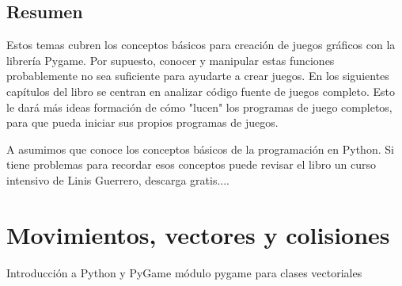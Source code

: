 {%






















\section{Resumen}

Estos temas  cubren los conceptos básicos para creación de juegos gráficos con la librería  Pygame. 
Por supuesto,  conocer y manipular estas funciones probablemente no sea suficiente para ayudarte a crear juegos. En los siguientes
capítulos del libro se centran en analizar código fuente de juegos completo. Esto le dará más  ideas formación  de cómo "{}lucen"{} los 
programas de juego completos, para que pueda iniciar  sus propios programas de juegos.

A asumimos que conoce los conceptos básicos de la programación en Python. Si tiene problemas para recordar esos conceptos puede revisar el libro un curso intensivo de Linis Guerrero, descarga gratis....\\










\chapter{Movimientos, vectores y colisiones}  Introducción a Python y PyGame
módulo pygame para clases vectoriales

}
